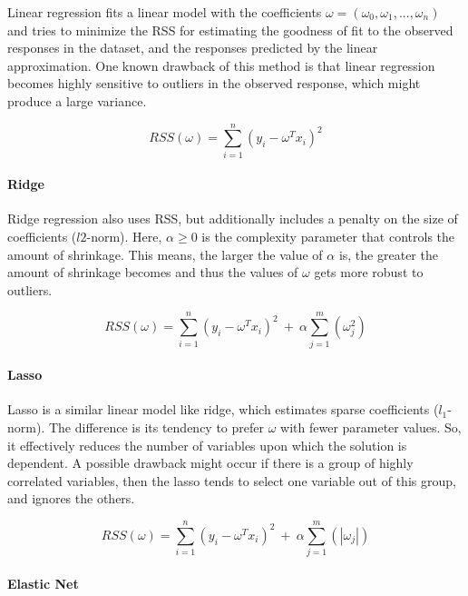 Linear regression fits a linear model with the coefficients $\omega = (\omega_0, \omega_1, ..., \omega_n)$ and tries to minimize the \ac{RSS} for estimating the goodness of fit to the observed responses in the dataset, and the responses predicted by the linear approximation.
One known drawback of this method is that linear regression becomes highly sensitive to outliers in the observed response, which might produce a large variance.

\begin{equation}
    \label{def:RSS:LinReg}
    RSS(\omega)=\sum_{i=1}^n(y_i-\omega^T x_i)^2
\end{equation}

\paragraph{Ridge}

Ridge regression also uses \ac{RSS}, but additionally includes a penalty on the size of coefficients ($l2$-norm). 
Here, $\alpha \geq 0$ is the complexity parameter that controls the amount of shrinkage. This means, the larger the value of $\alpha$ is, the greater the amount of shrinkage becomes and thus the values of $\omega$ gets more robust to outliers.

\begin{equation}
    \label{def:RSS:Ridge}
    RSS(\omega)=\sum_{i=1}^n(y_i-\omega^T x_i)^2\ +\ \alpha\sum_{j=1}^m(\omega_j^2)
\end{equation}


\paragraph{Lasso}

Lasso is a similar linear model like ridge, which estimates sparse coefficients ($l_1$-norm). The difference is its tendency to prefer $\omega$ with fewer parameter values. So, it effectively reduces the number of variables upon which the solution is dependent. A possible drawback might occur if there is a group of highly correlated variables, then the lasso tends to select one variable out of this group, and ignores the others.

\begin{equation}
    \label{def:RSS:Lasso}
    RSS(\omega)=\sum_{i=1}^n(y_i-\omega^T x_i)^2\ +\ \alpha\sum_{j=1}^m(|\omega_j|)
\end{equation}


\paragraph{Elastic Net}

